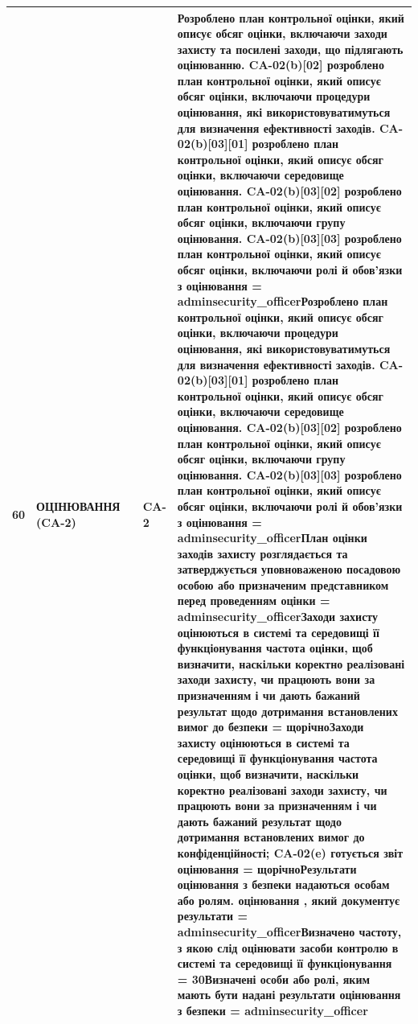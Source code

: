 \documentclass[10pt]{article}
\begin{document}
\begin{longtable}{|c|>{\raggedright\arraybackslash}p{2.5cm}|>{\raggedright\arraybackslash}p{4.5cm}|>{\raggedright\arraybackslash}p{3cm}|>{\raggedright\arraybackslash}p{4.5cm}|}
60 & ОЦІНЮВАННЯ (CA-2) &  & CA-2 & Розроблено план контрольної оцінки, який описує обсяг оцінки, включаючи заходи захисту та посилені заходи, що підлягають оцінюванню. CA-02(b)[02] розроблено план контрольної оцінки, який описує обсяг оцінки, включаючи процедури оцінювання, які використовуватимуться для визначення ефективності заходів. CA-02(b)[03][01] розроблено план контрольної оцінки, який описує обсяг оцінки, включаючи середовище оцінювання. CA-02(b)[03][02] розроблено план контрольної оцінки, який описує обсяг оцінки, включаючи групу оцінювання. CA-02(b)[03][03] розроблено план контрольної оцінки, який описує обсяг оцінки, включаючи ролі й обов'язки з оцінювання = \textbf{adminsecurity\_\allowbreak{}officer}\newline Розроблено план контрольної оцінки, який описує обсяг оцінки, включаючи процедури оцінювання, які використовуватимуться для визначення ефективності заходів. CA-02(b)[03][01] розроблено план контрольної оцінки, який описує обсяг оцінки, включаючи середовище оцінювання. CA-02(b)[03][02] розроблено план контрольної оцінки, який описує обсяг оцінки, включаючи групу оцінювання. CA-02(b)[03][03] розроблено план контрольної оцінки, який описує обсяг оцінки, включаючи ролі й обов'язки з оцінювання = \textbf{adminsecurity\_\allowbreak{}officer}\newline План оцінки заходів захисту розглядається та затверджується уповноваженою посадовою особою або призначеним представником перед проведенням оцінки = \textbf{adminsecurity\_\allowbreak{}officer}\newline Заходи захисту оцінюються в системі та середовищі її функціонування частота оцінки, щоб визначити, наскільки коректно реалізовані заходи захисту, чи працюють вони за призначенням і чи дають бажаний результат щодо дотримання встановлених вимог до безпеки = \textbf{щорічно}\newline Заходи захисту оцінюються в системі та середовищі її функціонування частота оцінки, щоб визначити, наскільки коректно реалізовані заходи захисту, чи працюють вони за призначенням і чи дають бажаний результат щодо дотримання встановлених вимог до конфіденційності; CA-02(e) готується звіт оцінювання = \textbf{щорічно}\newline Результати оцінювання з безпеки надаються особам або ролям. оцінювання , який документує результати = \textbf{adminsecurity\_\allowbreak{}officer}\newline Визначено частоту, з якою слід оцінювати засоби контролю в системі та середовищі її функціонування = \textbf{30}\newline Визначені особи або ролі, яким мають бути надані результати оцінювання з безпеки = \textbf{adminsecurity\_\allowbreak{}officer} \\ \hline

\end{longtable}
\end{document}
